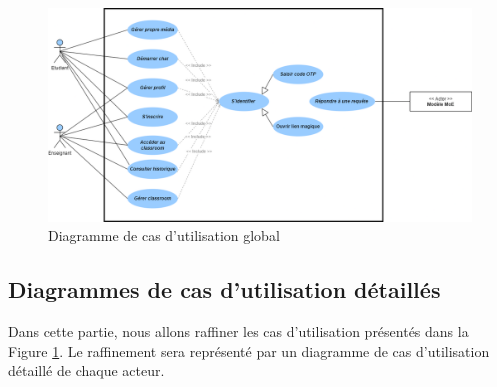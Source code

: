 \begin{figure}[H]
    \centering
    \includegraphics[width=1.1\textwidth,height=0.75\textheight]{images/chp3/fig2.png}
    \caption{Diagramme de cas d’utilisation global}
    \label{fig:diagramme de cas d’utilisation global}    
\end{figure}

\subsection{Diagrammes de cas d’utilisation détaillés}
Dans cette partie, nous allons raffiner les cas d'utilisation présentés dans la Figure \ref{fig:diagramme de cas d’utilisation global}. Le raffinement sera représenté par un diagramme de cas d'utilisation détaillé de chaque  acteur.

